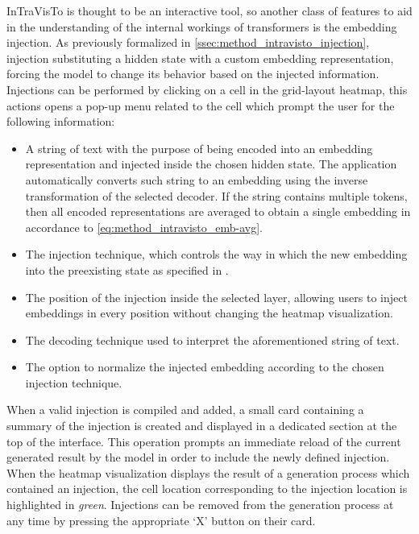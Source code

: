 InTraVisTo is thought to be an interactive tool, so another class of features to aid in the understanding of the internal workings of transformers is the embedding injection.
As previously formalized in \cref{ssec:method_intravisto_injection}, injection  substituting a hidden state with a custom embedding representation, forcing the model to change its behavior based on the injected information.
Injections can be performed by clicking on a cell in the grid-layout heatmap, this actions opens a pop-up menu related to the cell which prompt the user for the following information:
\begin{itemize}
    \item A string of text with the purpose of being encoded into an embedding representation and injected inside the chosen hidden state.
The application automatically converts such string to an embedding using the inverse transformation of the selected decoder.
If the string contains multiple tokens, then all encoded representations are averaged to obtain a single embedding in accordance to \cref{eq:method_intravisto_emb-avg}.
    \item The injection technique, which controls the way in which the new embedding  into the preexisting state as specified in .
    \item The position of the injection inside the selected layer, allowing users to inject embeddings in every position without changing the heatmap visualization.
    \item The decoding technique used to interpret the aforementioned string of text.
    \item The option to normalize the injected embedding according to the chosen injection technique. 
\end{itemize}

When a valid injection is compiled and added, a small card containing a summary of the injection is created and displayed in a dedicated section at the top of the interface.
This operation prompts an immediate reload of the current generated result by the model in order to include the newly defined injection.
When the heatmap visualization displays the result of a generation process which contained an injection, the cell location corresponding to the injection location is highlighted in \emph{green}.
Injections can be removed from the generation process at any time by pressing the appropriate `X' button on their card.


